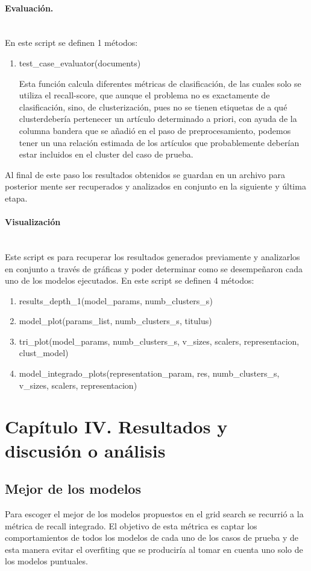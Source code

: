 \documentclass[12pt]{article}
\newcommand{\subsubsubsection}[1]{\paragraph{#1}\mbox{}\\}
\begin{document}
			\subsubsubsection{Evaluación.}
			En este script se definen 1 métodos:

			\begin{enumerate}
			
				\item test\_case\_evaluator(documents)
				 
				 Esta función calcula diferentes métricas de clasificación, de las cuales solo se utiliza el recall-score, que aunque el problema no es exactamente de clasificación, sino, de clusterización, pues no se tienen etiquetas de a qué clusterdebería pertenecer un artículo determinado a priori, con ayuda de la columna bandera que se añadió en el paso de preprocesamiento, podemos tener un una relación estimada de los artículos que probablemente deberían estar incluidos en el cluster del caso de prueba.
			
			\end{enumerate}
			
			Al final de este paso los resultados obtenidos se guardan en un archivo para posterior mente ser recuperados y analizados en conjunto en la siguiente y última etapa.
						
			\subsubsubsection{Visualización}
			Este script es para recuperar los resultados generados previamente y analizarlos en conjunto a través de gráficas y poder determinar como se desempeñaron cada uno de los modelos ejecutados.
			En este script se definen 4 métodos:

			\begin{enumerate}
				\item results\_depth\_1(model\_params, numb\_clusters\_s)
				
				\item model\_plot(params\_list, numb\_clusters\_s, titulus)
				
				\item tri\_plot(model\_params, numb\_clusters\_s, v\_sizes, scalers, representacion, clust\_model)
				
				\item model\_integrado\_plots(representation\_param, res, numb\_clusters\_s, v\_sizes, scalers, representacion)
			\end{enumerate}			
			
								
	\newpage
	\section{Capítulo IV. Resultados y discusión o análisis}	
	\subsection{Mejor de los modelos}
	Para escoger el mejor de los modelos propuestos en el grid search se recurrió a la métrica de recall integrado. El objetivo de esta métrica es captar los comportamientos de todos los modelos de cada uno de los casos de prueba y de esta manera evitar el overfiting que se produciría al tomar en cuenta uno solo de los modelos puntuales.
	
\end{document}
